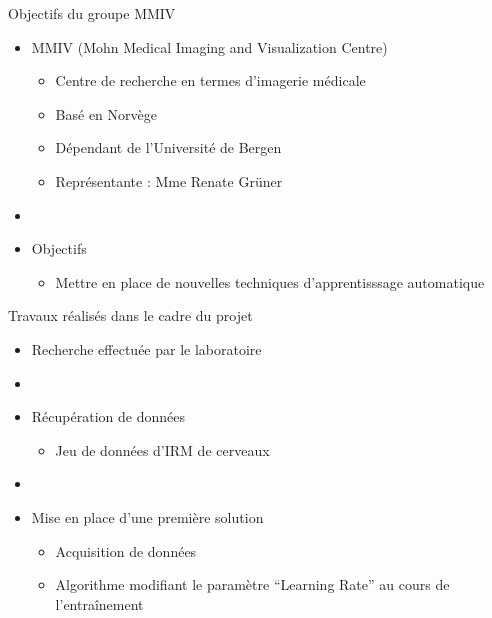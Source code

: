 \documentclass{beamer}
\begin{document}
\begin{frame}{Objectifs du groupe MMIV}
  \begin{itemize}
    \item MMIV (Mohn Medical Imaging and Visualization Centre)
    \begin{itemize}
      \item Centre de recherche en termes d'imagerie médicale
      \item Basé en Norvège
      \item Dépendant de l'Université de Bergen
      \item Représentante : Mme Renate Grüner
    \end{itemize}
    \item[]
    \item Objectifs
    \begin{itemize}
      \item Mettre en place de nouvelles techniques d'apprentisssage automatique
    \end{itemize}
  \end{itemize}
\end{frame}

\begin{frame}{Travaux réalisés dans le cadre du projet}
  \begin{itemize}
    \item Recherche effectuée par le laboratoire
    \item[]
    \item Récupération de données
    \begin{itemize}
      \item Jeu de données d'IRM de cerveaux
    \end{itemize}
    \item[]
    \item Mise en place d'une première solution
    \begin{itemize}
      \item Acquisition de données
      \item Algorithme modifiant le paramètre ``Learning Rate'' au cours de l'entraînement
    \end{itemize}
  \end{itemize}
\end{frame}
\end{document}
